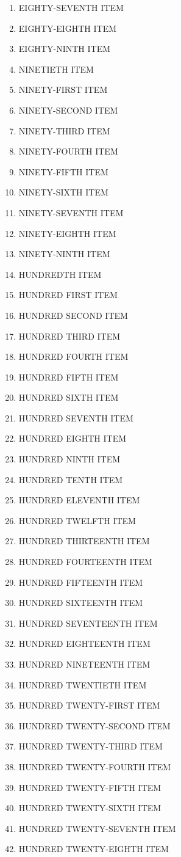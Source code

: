 \documentclass[11pt,letterpaper,oldstylefigures]{memoir}
\begin{document}
\begin{enumerate}
\item EIGHTY-SEVENTH ITEM
\item EIGHTY-EIGHTH ITEM
\item EIGHTY-NINTH ITEM
\item NINETIETH ITEM
\item NINETY-FIRST ITEM
\item NINETY-SECOND ITEM
\item NINETY-THIRD ITEM
\item NINETY-FOURTH ITEM
\item NINETY-FIFTH ITEM
\item NINETY-SIXTH ITEM
\item NINETY-SEVENTH ITEM
\item NINETY-EIGHTH ITEM
\item NINETY-NINTH ITEM
\item HUNDREDTH ITEM
\item HUNDRED FIRST ITEM
\item HUNDRED SECOND ITEM
\item HUNDRED THIRD ITEM
\item HUNDRED FOURTH ITEM
\item HUNDRED FIFTH ITEM
\item HUNDRED SIXTH ITEM
\item HUNDRED SEVENTH ITEM
\item HUNDRED EIGHTH ITEM
\item HUNDRED NINTH ITEM
\item HUNDRED TENTH ITEM
\item HUNDRED ELEVENTH ITEM
\item HUNDRED TWELFTH ITEM
\item HUNDRED THIRTEENTH ITEM
\item HUNDRED FOURTEENTH ITEM
\item HUNDRED FIFTEENTH ITEM
\item HUNDRED SIXTEENTH ITEM
\item HUNDRED SEVENTEENTH ITEM
\item HUNDRED EIGHTEENTH ITEM
\item HUNDRED NINETEENTH ITEM
\item HUNDRED TWENTIETH ITEM
\item HUNDRED TWENTY-FIRST ITEM
\item HUNDRED TWENTY-SECOND ITEM
\item HUNDRED TWENTY-THIRD ITEM
\item HUNDRED TWENTY-FOURTH ITEM
\item HUNDRED TWENTY-FIFTH ITEM
\item HUNDRED TWENTY-SIXTH ITEM
\item HUNDRED TWENTY-SEVENTH ITEM
\item HUNDRED TWENTY-EIGHTH ITEM
\end{enumerate}
\end{document}
